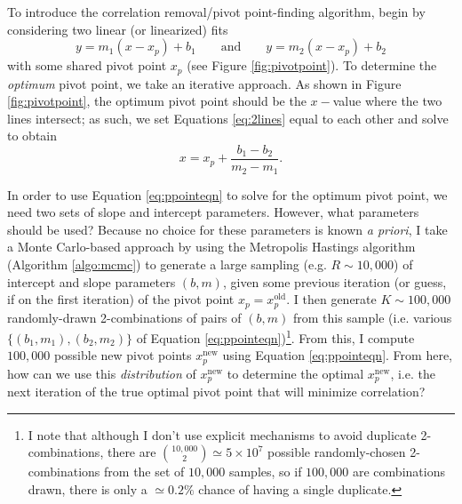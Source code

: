 To introduce the correlation removal/pivot point-finding algorithm, begin by considering two linear (or linearized) fits 
\begin{equation}
\label{eq:2lines}
    y=m_1(x-x_p)+b_1 \qquad\text{and}\qquad y=m_2(x-x_p)+b_2
\end{equation}
with some shared pivot point $x_p$ (see Figure \ref{fig:pivotpoint}). To determine the \textit{optimum} pivot point, we take an iterative approach. As shown in Figure \ref{fig:pivotpoint}, the optimum pivot point should be the $x-$value where the two lines intersect; as such, we set Equations \eqref{eq:2lines} equal to each other and solve to obtain
\begin{equation}
    \label{eq:ppointeqn}
    x=x_p+ \frac{b_1-b_2}{m_2-m_1}.
\end{equation}

In order to use Equation \eqref{eq:ppointeqn} to solve for the optimum pivot point, we need two sets of slope and intercept parameters. However, what parameters should be used? Because no choice for these parameters is known \textit{a priori}, I take a Monte Carlo-based approach by using the Metropolis Hastings algorithm (Algorithm \ref{algo:mcmc}) to generate a large sampling (e.g. $R\sim 10,000$) of intercept and slope parameters $(b,m)$, given some previous iteration (or guess, if on the first iteration) of the pivot point $x_p=x_p^\text{old}$. I then generate $K\sim 100,000$ randomly-drawn 2-combinations of pairs of $(b,m)$ from this sample (i.e. various $\{(b_1,m_1),(b_2,m_2)\}$ of Equation \eqref{eq:ppointeqn})\footnote{I note that although I don't use explicit mechanisms to avoid duplicate 2-combinations, there are $\binom{10,000}{2} \simeq 5\times 10^7$ possible randomly-chosen 2-combinations from the set of $10,000$ samples, so if $100,000$ are combinations drawn, there is only a $\simeq 0.2\%$ chance of having a single duplicate.}. From this, I compute $100,000$ possible new pivot points $x_p^\text{new}$ using Equation \eqref{eq:ppointeqn}. From here, how can we use this \textit{distribution} of $x_p^\text{new}$ to determine the optimal $x_p^\text{new}$, i.e. the next iteration of the true optimal pivot point that will minimize correlation?

